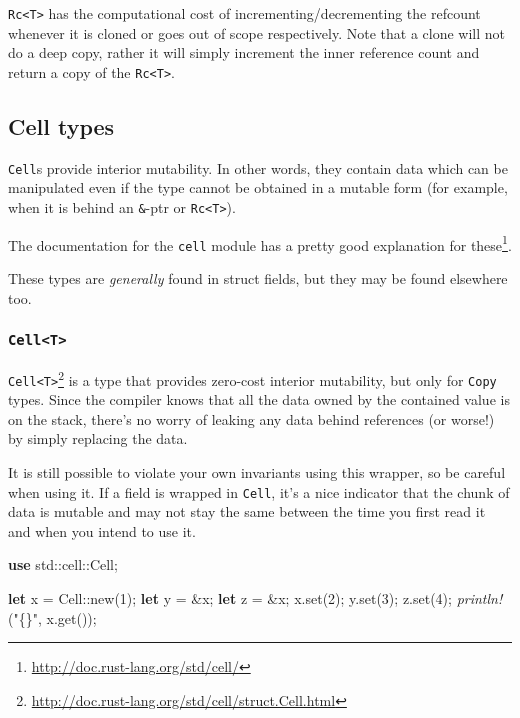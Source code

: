 \documentclass[a4paper,]{book}
\newenvironment{Shaded}{\begin{snugshade}}{\end{snugshade}}
\newcommand{\KeywordTok}[1]{\textcolor[rgb]{0.13,0.29,0.53}{\textbf{{#1}}}}
\newcommand{\DecValTok}[1]{\textcolor[rgb]{0.00,0.00,0.81}{{#1}}}
\newcommand{\StringTok}[1]{\textcolor[rgb]{0.31,0.60,0.02}{{#1}}}
\newcommand{\PreprocessorTok}[1]{\textcolor[rgb]{0.56,0.35,0.01}{\textit{{#1}}}}
\newcommand{\NormalTok}[1]{{#1}}
\renewcommand{\href}[2]{#2\footnote{\url{#1}}}
\begin{document}
\texttt{Rc\textless{}T\textgreater{}} has the computational cost of
incrementing/decrementing the refcount whenever it is cloned or goes out
of scope respectively. Note that a clone will not do a deep copy, rather
it will simply increment the inner reference count and return a copy of
the \texttt{Rc\textless{}T\textgreater{}}.

\subsection{Cell types}\label{cell-types}

\texttt{Cell}s provide interior mutability. In other words, they contain
data which can be manipulated even if the type cannot be obtained in a
mutable form (for example, when it is behind an \texttt{\&}-ptr or
\texttt{Rc\textless{}T\textgreater{}}).

\href{http://doc.rust-lang.org/std/cell/}{The documentation for the
\texttt{cell} module has a pretty good explanation for these}.

These types are \emph{generally} found in struct fields, but they may be
found elsewhere too.

\subsubsection{\texorpdfstring{\texttt{Cell\textless{}T\textgreater{}}}{Cell\textless{}T\textgreater{}}}\label{cellt}

\href{http://doc.rust-lang.org/std/cell/struct.Cell.html}{\texttt{Cell\textless{}T\textgreater{}}}
is a type that provides zero-cost interior mutability, but only for
\texttt{Copy} types. Since the compiler knows that all the data owned by
the contained value is on the stack, there's no worry of leaking any
data behind references (or worse!) by simply replacing the data.

It is still possible to violate your own invariants using this wrapper,
so be careful when using it. If a field is wrapped in \texttt{Cell},
it's a nice indicator that the chunk of data is mutable and may not stay
the same between the time you first read it and when you intend to use
it.

\begin{Shaded}
\begin{Highlighting}[]
\KeywordTok{use} \NormalTok{std::cell::Cell;}

\KeywordTok{let} \NormalTok{x = Cell::new(}\DecValTok{1}\NormalTok{);}
\KeywordTok{let} \NormalTok{y = &x;}
\KeywordTok{let} \NormalTok{z = &x;}
\NormalTok{x.set(}\DecValTok{2}\NormalTok{);}
\NormalTok{y.set(}\DecValTok{3}\NormalTok{);}
\NormalTok{z.set(}\DecValTok{4}\NormalTok{);}
\PreprocessorTok{println!}\NormalTok{(}\StringTok{"\{\}"}\NormalTok{, x.get());}
\end{Highlighting}
\end{Shaded}
\end{document}
